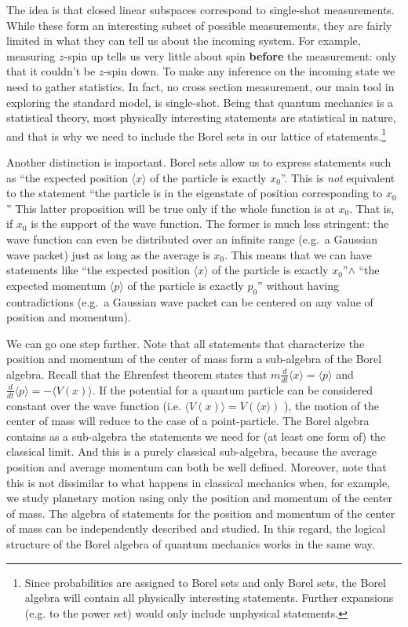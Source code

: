 \documentclass[11pt, executivepaper]{article}
\begin{document}
The idea is that closed linear subspaces correspond to single-shot measurements. While these form an interesting subset of possible measurements, they are fairly limited in what they can tell us about the incoming system. For example, measuring $z$-spin up tells us very little about spin \textbf{before} the measurement: only that it couldn't be $z$-spin down. To make any inference on the incoming state we need to gather statistics. In fact, no cross section measurement, our main tool in exploring the standard model, is single-shot. Being that quantum mechanics is a statistical theory, most physically interesting statements are statistical in nature, and that is why we need to include the Borel sets in our lattice of statements.\footnote{Since probabilities are assigned to Borel sets and only Borel sets, the Borel algebra will contain all physically interesting statements. Further expansions (e.g. to the power set) would only include unphysical statements.}

Another distinction is important. Borel sets allow us to express statements such as ``the expected position $\langle x \rangle$ of the particle is exactly $x_0$''. This is \emph{not} equivalent to the statement ``the particle is in the eigenstate of position corresponding to $x_0$'' This latter proposition will be true only if the whole function is at $x_0$. That is, if $x_0$ is the support of the wave function. The former is much less stringent: the wave function can even be distributed over an infinite range (e.g.\ a Gaussian wave packet) just as long as the average is $x_0$. This means that we can have statements like ``the expected position $\langle x \rangle$ of the particle is exactly $x_0$''$\wedge$ ``the expected momentum $\langle p \rangle$ of the particle is exactly $p_0$'' without having contradictions (e.g.\ a Gaussian wave packet can be centered on any value of position and momentum).

We can go one step further. Note that all statements that characterize the position and momentum of the center of mass form a sub-algebra of the Borel algebra. Recall that the Ehrenfest theorem states that $m \frac{d}{dt}\langle x \rangle = \langle p \rangle$ and $ \frac{d}{dt}\langle p \rangle = - \langle V(x) \rangle$. If the potential for a quantum particle can be considered constant over the wave function (i.e. $\langle V(x) \rangle = V(\langle x \rangle)$ ), the motion of the center of mass will reduce to the case of a point-particle. The Borel algebra contains as a sub-algebra the statements we need for (at least one form of) the classical limit. And this is a purely classical sub-algebra, because the average position and average momentum can both be well defined. Moreover, note that this is not dissimilar to what happens in classical mechanics when, for example, we study planetary motion using only the position and momentum of the center of mass. The algebra of statements for the position and momentum of the center of mass can be independently described and studied. In this regard, the logical structure of the Borel algebra of quantum mechanics works in the same way.
\end{document}
